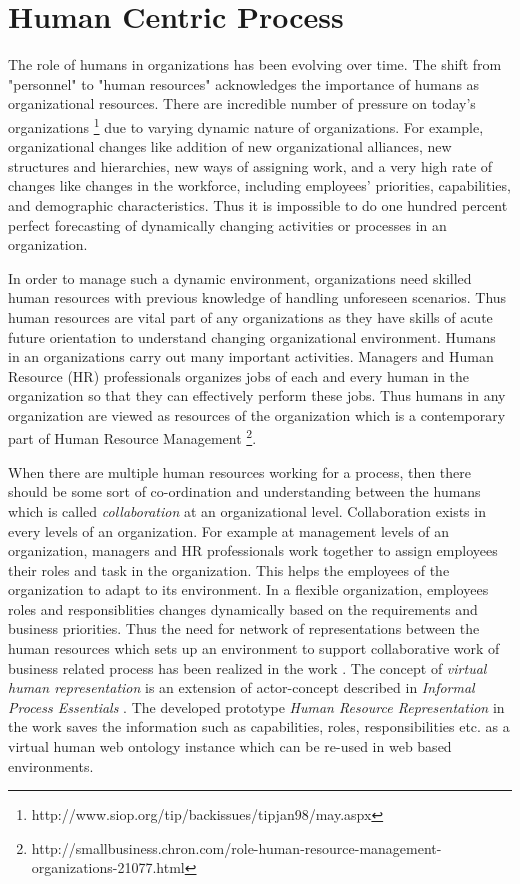 \section{Human Centric Process}
\label{sec:humancentric}
The role of humans in organizations has been evolving over time. The shift from "personnel" to "human resources" acknowledges the importance of humans as organizational resources. There are incredible number of pressure on today's organizations \footnote{http://www.siop.org/tip/backissues/tipjan98/may.aspx} due to varying dynamic nature of organizations. For example, organizational changes like addition of new organizational alliances, new structures and hierarchies, new ways of assigning work, and a very high rate of changes like changes in the workforce, including employees' priorities, capabilities, and demographic characteristics. Thus it is impossible to do one hundred percent perfect forecasting of dynamically changing activities or processes in an organization.

In order to manage such a dynamic environment, organizations need skilled human resources with previous knowledge of handling unforeseen scenarios. Thus human resources are vital part of any organizations as they have skills of acute future orientation to understand changing organizational environment. Humans in an organizations carry out many important activities. Managers and Human Resource (HR) professionals organizes jobs of each and every human in the organization so that they can effectively perform these jobs. Thus humans in any organization are viewed as resources of the organization which is a contemporary part of Human Resource Management \footnote{http://smallbusiness.chron.com/role-human-resource-management-organizations-21077.html}.

When there are multiple human resources working for a process, then there should be some sort of co-ordination and understanding between the humans which is called \textit{collaboration} at an organizational level. Collaboration exists in every levels of an organization. For example at management levels of an organization, managers and HR professionals work together to assign employees their roles and task in the organization. This helps the employees of the organization to adapt to its environment. In a flexible organization, employees roles and responsiblities changes dynamically based on the requirements and business priorities. Thus the need for network of representations between the human resources which sets up an environment to support collaborative work of business related process has been realized in the work \cite{Canko2015}. The concept of \textit{virtual human representation} is an extension of  actor-concept described in  \textit{Informal Process Essentials} \cite{Sungur2014a}. The developed prototype \textit{Human Resource Representation} in the work \cite{Canko2015} saves the information such as capabilities, roles, responsibilities etc.  as a virtual human web ontology instance which can be re-used in web based environments.

